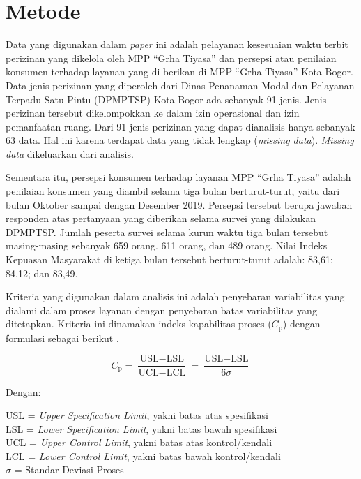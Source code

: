 \section{Metode} %


Data yang digunakan dalam \textit{paper} ini adalah pelayanan kesesuaian waktu terbit perizinan yang dikelola oleh MPP ``Grha Tiyasa'' dan persepsi atau penilaian konsumen terhadap layanan yang di berikan di MPP ``Grha Tiyasa'' Kota Bogor. Data jenis perizinan yang diperoleh dari Dinas Penanaman Modal dan Pelayanan Terpadu Satu Pintu (DPMPTSP) Kota Bogor ada sebanyak 91 jenis. Jenis perizinan tersebut dikelompokkan ke dalam izin operasional dan izin pemanfaatan ruang. Dari 91 jenis perizinan yang dapat dianalisis hanya sebanyak 63 data. Hal ini karena terdapat data yang tidak lengkap (\textit{missing data}). \textit{Missing data} dikeluarkan dari analisis.

Sementara itu, persepsi konsumen terhadap layanan MPP ``Grha Tiyasa'' adalah penilaian konsumen yang diambil selama tiga bulan berturut-turut, yaitu dari bulan Oktober sampai dengan Desember 2019. Persepsi tersebut berupa jawaban responden atas pertanyaan yang diberikan selama survei yang dilakukan DPMPTSP. Jumlah peserta survei selama kurun waktu tiga bulan tersebut masing-masing sebanyak 659 orang. 611 orang, dan 489 orang. Nilai Indeks Kepuasan Masyarakat di ketiga bulan tersebut berturut-turut adalah: 83,61; 84,12; dan 83,49.

Kriteria yang digunakan dalam analisis ini adalah penyebaran variabilitas yang dialami dalam proses layanan dengan penyebaran batas variabilitas yang ditetapkan. Kriteria ini dinamakan indeks kapabilitas proses ($C_{\mathrm{p}}$) dengan formulasi sebagai berikut \cite{montgomery2013, wooluru2014process}.

\begin{equation}
    C_{\mathrm{p}} = \frac{\text{USL} - \text{LSL}}{\text{UCL} - \text{LCL}} = \frac{\text{USL} - \text{LSL}}{6\sigma}
\end{equation}

\noindent Dengan:

\begin{tabbing}
    USL \= = \textit{Upper Specification Limit}, yakni batas atas spesifikasi \\
    LSL \> = \textit{Lower Specification Limit}, yakni batas bawah spesifikasi \\
    UCL \> = \textit{Upper Control Limit}, yakni batas atas kontrol/kendali \\
    LCL \> = \textit{Lower Control Limit}, yakni batas bawah kontrol/kendali \\
    $\sigma$ \> = Standar Deviasi Proses
\end{tabbing}

